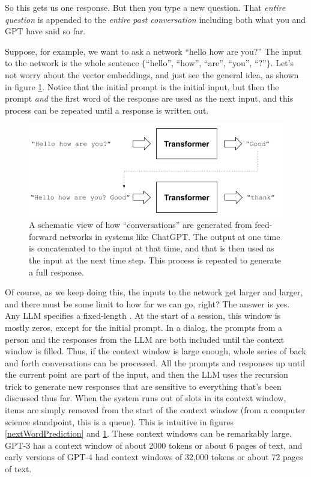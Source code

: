 So this gets us one response. But then you type a new question. That \emph{entire question} is appended to the \emph{entire past conversation} including both what you and GPT have said so far. 

Suppose, for example, we want to ask a network ``hello how are you?'' The input to the network is the whole sentence $\{$``hello'', ``how'', ``are'', ``you'', ``?''$\}$. Let's  not worry about the vector embeddings, and just see the general idea, as shown in figure \ref{gptRecursedInputs}. Notice that the initial prompt is the initial input, but then the prompt \emph{and} the first word of the response are used as the next input, and this process can be repeated until a response is written out.
  
\begin{figure}[h]
\centering
\includegraphics[scale=.7]{./images/gptRecursedInputs.png}
\caption[Jeff Yoshimi]{A schematic view of how ``conversations'' are generated from feed-forward networks in systems like ChatGPT. The output at one time is concatenated to the input at that time, and that is then used as the input at the next time step. This process is repeated to generate a full response.}
\label{gptRecursedInputs}
\end{figure}

Of course, as we keep doing this, the inputs to the network get larger and larger, and there must be some limit to how far we can go, right? The answer is yes. Any LLM specifies a fixed-length . At the start of a session, this window is mostly zeros, except for the initial prompt. In a dialog, the prompts from a person and the responses from the LLM are both included until the context window is filled. Thus, if the context window is large enough, whole series of back and forth conversations can be processed. All the prompts and responses up until the current point are part of the input, and then the LLM uses the recursion trick to generate new responses that are sensitive to everything that's been discussed thus far. When the system runs out of slots in its context window, items are simply removed from the start of the context window (from a computer science standpoint, this is a queue). This is intuitive in figures \ref{nextWordPrediction} and \ref{gptRecursedInputs}. These context windows can be remarkably large. GPT-3 has a context window of about 2000 tokens or about 6 pages of text, and early versions of GPT-4 had context windows of 32,000 tokens or about 72 pages of text. 

